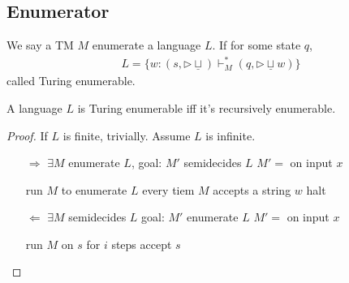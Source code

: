 \subsection{Enumerator}

\begin{definition}
    We say a TM $M$ enumerate a language $L$. If for some state $q$, 
    \begin{align*}
        L=\{ w: (s,\triangleright \underline{\sqcup})\vdash_M^*(q,\triangleright \underline{\sqcup} w) \}
    \end{align*}
    called Turing enumerable. 
\end{definition}

\begin{theorem}
    A language $L$ is Turing enumerable iff it's recursively enumerable. 
\end{theorem}
\begin{proof}
    If $L$ is finite, trivially. Assume $L$ is infinite.
    \begin{itemize}
        \item [$\Rightarrow$] $\exists M$ enumerate $L$, 
        \subitem goal: $M'$ semidecides $L$ 
        \subitem $M'=$ on input $x$
        \begin{algorithm}[H]
            \caption{$M'$}
            \begin{algorithmic}
                \State run $M$ to enumerate $L$
                \State every tiem $M$ accepts a string $w$
                    \State halt
                \EndIf
            \end{algorithmic}
        \end{algorithm}
        \item [$\Leftarrow$] $\exists M$ semidecides $L$
        \subitem goal: $M'$ enumerate $L$
        \subitem $M'=$ on input $x$
        \begin{algorithm}[H]
            \caption{$M'$}
            \begin{algorithmic}
                        \State run $M$ on $s$ for $i$ steps
                            \State accept $s$
                        \EndIf
                    \EndFor
                \EndFor
            \end{algorithmic}
        \end{algorithm}
    \end{itemize}
\end{proof}

